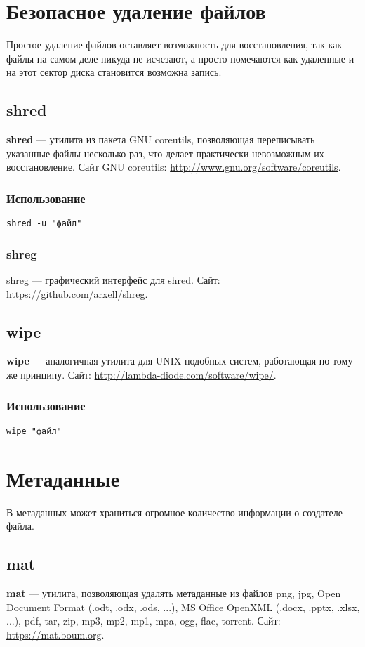 \section{Безопасное удаление файлов}
\begin{important}
Простое удаление файлов оставляет возможность для восстановления, так как файлы на самом деле никуда не исчезают, а просто помечаются как удаленные и на этот сектор диска становится возможна запись.
\end{important}
\subsection{shred}
\textbf{shred} --- утилита из пакета GNU coreutils, позволяющая переписывать указанные файлы несколько раз, что делает практически невозможным их восстановление. Сайт GNU coreutils: \url{http://www.gnu.org/software/coreutils}.
\subsubsection{Использование}
\begin{lstlisting}
shred -u "файл"
\end{lstlisting}
\subsubsection{shreg}
shreg --- графический интерфейс для shred. Сайт: \url{https://github.com/arxell/shreg}.
\subsection{wipe}
\textbf{wipe} --- аналогичная утилита для UNIX-подобных систем, работающая по тому же принципу. Сайт: \url{http://lambda-diode.com/software/wipe/}.
\subsubsection{Использование}
\begin{lstlisting}
wipe "файл"
\end{lstlisting}
\section{Метаданные}
\begin{important}
В метаданных может храниться огромное количество информации о создателе файла.
\end{important}
\subsection{mat}
\textbf{mat} --- утилита, позволяющая удалять метаданные из файлов png, jpg, Open Document Format (.odt, .odx, .ods, ...), MS Office OpenXML (.docx, .pptx, .xlsx, ...), pdf, tar, zip, mp3, mp2, mp1, mpa, ogg, flac, torrent. Сайт: \url{https://mat.boum.org}.
